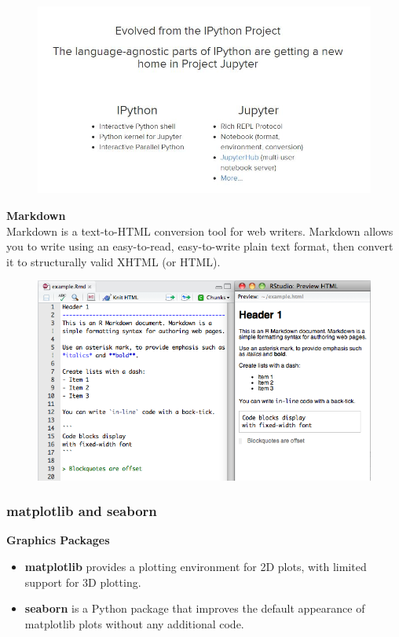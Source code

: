 \documentclass[MASTER.tex]{subfiles}
\begin{document}
\begin{frame}
	\begin{figure}
\centering
\includegraphics[width=1.0\linewidth]{jupytersiteinfo}

\end{figure}

\end{frame}
\begin{frame}
	\textbf{Markdown}
	\\
	Markdown is a text-to-HTML conversion tool for web writers. Markdown allows you to write using an easy-to-read, easy-to-write plain text format, then convert it to structurally valid XHTML (or HTML).
	\begin{figure}
\centering
\includegraphics[width=0.80\linewidth]{markdownOverview}

\end{figure}

\end{frame}
\begin{frame}
\frametitle{matplotlib and seaborn}
\large
	\vspace{-0.4cm}
\textbf{Graphics Packages}
\begin{itemize}
\item \textbf{matplotlib} provides a plotting environment for 2D plots, with limited support for 3D plotting. 
\item \textbf{seaborn} is
a Python package that improves the default appearance of matplotlib plots without any additional code.
\end{itemize}

\end{frame}
\end{document}
